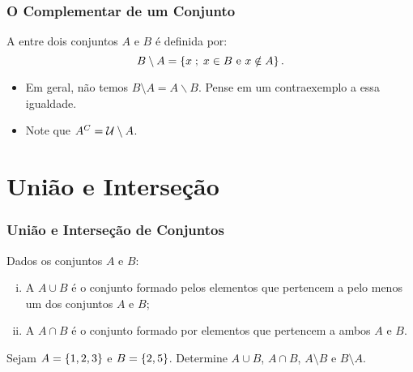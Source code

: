 \documentclass[brazil, notheorems, 10pt]{beamer}
\begin{document}
\begin{frame}
\frametitle{O Complementar de um Conjunto} %

\begin{Def}
A  entre dois conjuntos $A$ e $B$ é definida por:
$$ B \setminus A = \left\{x \;;\; x \in B \text { e } x \notin A\right\}.$$
\end{Def}

\begin{itemize}
	\item Em geral, não temos $B \setminus A = A \backslash B$. Pense em um contraexemplo a essa
	igualdade.
	\item Note que $A^C = \mathcal U \setminus A$.
\end{itemize}

\end{frame}

\section{União e Interseção}
\begin{frame}
\frametitle{União e Interseção de Conjuntos} %

\begin{Def}
Dados os conjuntos $A$ e $B$:
\begin{enumerate}[i.]
	\item A  $A \cup B$ é o conjunto formado pelos
	elementos que pertencem a pelo menos um dos conjuntos $A$ e $B$;
	\item A  $A \cap B$ é o conjunto formado por elementos que pertencem a ambos $A$ e
	$B$.
\end{enumerate}
\end{Def}

\begin{Exem}
Sejam $A = \left\{1, 2, 3\right\}$ e $ B = \left\{2,5\right\}$. Determine $A \cup B$,
$A \cap B$, $A \setminus B$ e $B \setminus A$.
\end{Exem}

\end{frame}

\end{document}
